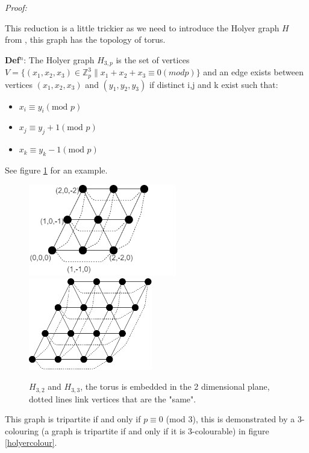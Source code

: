 \documentclass[a4paper,11pt]{report}
\newcounter{col}
\begin{document}
\textit{Proof:}

This reduction is a little trickier as we need to introduce the Holyer graph $H$ from \cite{holyer}, this graph has the topology of torus.

\textbf{Def$^n$}: The Holyer graph $H_{3,p}$ is the set of vertices $V=\{(x_1,x_2,x_3)\in \mathbb{Z}_p^3 \| x_1+x_2+x_3 \equiv 0 (mod p)\}$ and an edge exists between vertices $(x_1,x_2,x_3)$ and $(y_1,y_2,y_3)$ if distinct i,j and k exist such that:
\begin{itemize}
\item $x_i\equiv y_i (\text{mod }p)$
\item $x_j\equiv y_j+1 (\text{mod }p)$
\item $x_k\equiv y_k-1 (\text{mod }p)$
\end{itemize}
See figure \ref{holyer} for an example.

\begin{figure}[h!]
\begin{center}
		\includegraphics[height=40mm]{figures/holyer_coord.png}
		\includegraphics[height=40mm]{figures/holyer_3_4.png}
\end{center}
		\caption{$H_{3,2} $ and $H_{3,3}$, the torus is embedded in the 2 dimensional plane, dotted lines link vertices that are the "same".}
		\label{holyer}
\end{figure}

This graph is tripartite if and only if $p\equiv 0 $ (mod 3), this is demonstrated by a 3-colouring (a graph is tripartite if and only if it is 3-colourable) in figure \ref{holyercolour}.
\end{document}
